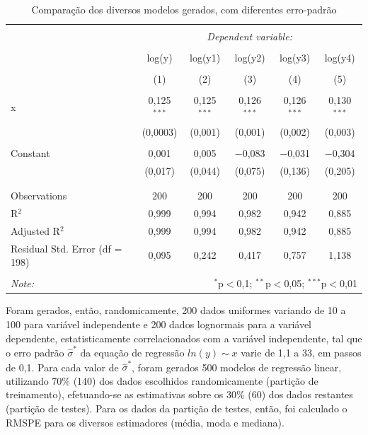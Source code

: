 \documentclass[a4paper, 12pt]{article}
\begin{document}
\begin{table}[!htbp] \centering 
  \caption{Comparação dos diversos modelos gerados, com diferentes erro-padrão} 
  \label{tab:fits} 
\begin{tabular}{@{\extracolsep{5pt}}lccccc} 
\\[-1.8ex]\hline 
\hline \\[-1.8ex] 
 & \multicolumn{5}{c}{\textit{Dependent variable:}} \\ 
\cline{2-6} 
\\[-1.8ex] & log(y) & log(y1) & log(y2) & log(y3) & log(y4) \\ 
\\[-1.8ex] & (1) & (2) & (3) & (4) & (5)\\ 
\hline \\[-1.8ex] 
 x & 0,125$^{***}$ & 0,125$^{***}$ & 0,126$^{***}$ & 0,126$^{***}$ & 0,130$^{***}$ \\ 
  & (0,0003) & (0,001) & (0,001) & (0,002) & (0,003) \\ 
  & & & & & \\ 
 Constant & 0,001 & 0,005 & $-$0,083 & $-$0,031 & $-$0,304 \\ 
  & (0,017) & (0,044) & (0,075) & (0,136) & (0,205) \\ 
  & & & & & \\ 
\hline \\[-1.8ex] 
Observations & 200 & 200 & 200 & 200 & 200 \\ 
R$^{2}$ & 0,999 & 0,994 & 0,982 & 0,942 & 0,885 \\ 
Adjusted R$^{2}$ & 0,999 & 0,994 & 0,982 & 0,942 & 0,885 \\ 
Residual Std. Error (df = 198) & 0,095 & 0,242 & 0,417 & 0,757 & 1,138 \\ 
\hline 
\hline \\[-1.8ex] 
\textit{Note:}  & \multicolumn{5}{r}{$^{*}$p$<$0,1; $^{**}$p$<$0,05; $^{***}$p$<$0,01} \\ 
\end{tabular} 
\end{table}

Foram gerados, então, randomicamente, 200 dados uniformes variando de 10
a 100 para variável independente e 200 dados lognormais para a variável
dependente, estatisticamente correlacionados com a variável
independente, tal que o erro padrão \(\hat{\sigma}^*\) da equação de
regressão \(ln(y) \sim x\) varie de 1,1 a 33, em passos de 0,1. Para
cada valor de \(\hat{\sigma}^*\), foram gerados 500 modelos de regressão
linear, utilizando 70\% (140) dos dados escolhidos randomicamente
(partição de treinamento), efetuando-se as estimativas sobre os 30\%
(60) dos dados restantes (partição de testes). Para os dados da partição
de testes, então, foi calculado o RMSPE para os diversos estimadores
(média, moda e mediana).
\end{document}
